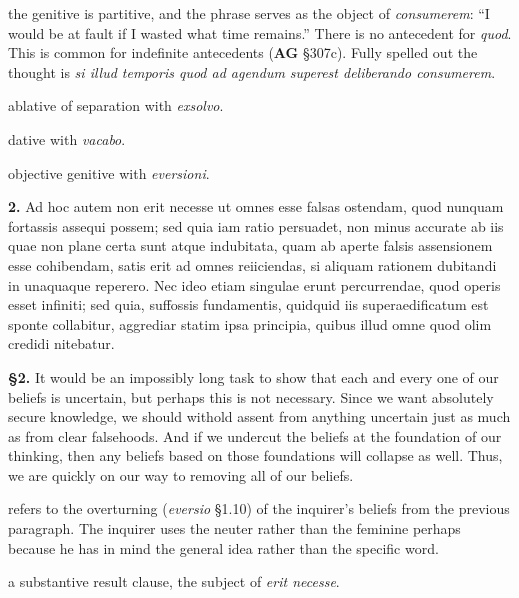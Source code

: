  the genitive is partitive, and the phrase serves as the object of \textit{consumerem}: ``I would be at fault if I wasted what time remains.'' There is no antecedent for \textit{quod}. This is common for indefinite antecedents (\textbf{AG} §307c). Fully spelled out the thought is \textit{si illud temporis quod ad agendum superest deliberando consumerem}.

 ablative of separation with \textit{exsolvo}.

 dative with \textit{vacabo}.

 objective genitive with \textit{eversioni}.


\clearpage

\beginnumbering
\pstart
\begin{latin}
    \textenglish{\textbf{2.}} Ad hoc autem non erit necesse ut omnes esse falsas ostendam, quod nunquam fortassis assequi possem; sed quia iam ratio persuadet, non minus accurate ab iis quae non plane certa sunt atque indubitata, quam ab aperte falsis assensionem esse cohibendam, satis erit ad omnes reiiciendas, si aliquam rationem dubitandi in unaquaque reperero. Nec ideo etiam singulae erunt percurrendae, quod operis esset infiniti; sed quia, suffossis fundamentis, quidquid iis superaedificatum est sponte collabitur, aggrediar statim ipsa principia, quibus illud omne quod olim credidi nitebatur.
\end{latin}
\pend
\endnumbering

\prenotes

\textbf{§2.} It would be an impossibly long task to show that each and every one of our beliefs is uncertain, but perhaps this is not necessary. Since we want absolutely secure knowledge, we should withold assent from anything uncertain just as much as from clear falsehoods. And if we undercut the beliefs at the foundation of our thinking, then any beliefs based on those foundations will collapse as well. Thus, we are quickly on our way to removing all of our beliefs.

 refers to the overturning (\textit{eversio} §1.10) of the inquirer's beliefs from the previous paragraph. The inquirer uses the neuter rather than the feminine perhaps because he has in mind the general idea rather than the specific word.

 a substantive result clause, the subject of \textit{erit necesse}.

